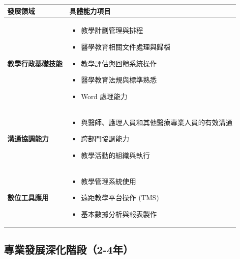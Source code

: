 \documentclass[12pt,a4paper]{article}
\begin{document}
\begin{longtable}{P{4cm}P{12cm}}
\toprule
\textbf{發展領域} & \textbf{具體能力項目} \\
\midrule
\endhead

\textbf{教學行政基礎技能} &
\begin{itemize}[leftmargin=*,itemsep=1pt,parsep=0pt]
  \item 教學計劃管理與排程
  \item 醫學教育相關文件處理與歸檔
  \item 教學評估與回饋系統操作
  \item 醫學教育法規與標準熟悉
  \item Word 處理能力
\end{itemize} \\
\midrule

\textbf{溝通協調能力} &
\begin{itemize}[leftmargin=*,itemsep=1pt,parsep=0pt]
  \item 與醫師、護理人員和其他醫療專業人員的有效溝通
  \item 跨部門協調能力
  \item 教學活動的組織與執行
\end{itemize} \\
\midrule

\textbf{數位工具應用} &
\begin{itemize}[leftmargin=*,itemsep=1pt,parsep=0pt]
  \item 教學管理系統使用
  \item 遠距教學平台操作 (TMS)
  \item 基本數據分析與報表製作
\end{itemize} \\
\bottomrule

\end{longtable}

\subsection{專業發展深化階段（2-4年）}
\end{document}
